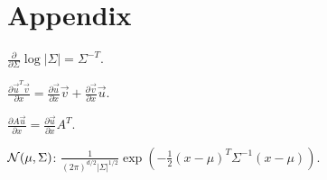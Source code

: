 \section{Appendix}

$\frac{\partial}{\partial \Sigma} \log|\Sigma| = \Sigma^{-T}$.

$\frac{\partial \overrightarrow{u}^T \overrightarrow{v}}{\partial x} = \frac{\partial \overrightarrow{u}}{\partial x} \overrightarrow{v} +\frac{\partial \overrightarrow{v}}{\partial x} \overrightarrow{u}$.

$\frac{\partial A\overrightarrow{u}}{\partial x} = \frac{\partial\overrightarrow{u}}{\partial x} A^T$.

$\mathcal{N}(\mu,\Sigma)$: $\frac{1}{(2\pi)^{d/2}|\Sigma|^{1/2}} \exp(-\frac{1}{2}(x-\mu)^T \Sigma^{-1} (x-\mu))$.